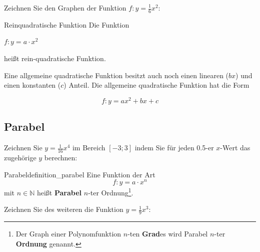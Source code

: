 Zeichnen Sie den Graphen der Funktion $f: y= \frac16 x^2$:


\begin{definition}{Reinquadratische Funktion}{}
Die Funktion

$f: y = a\cdot{}x^2$

heißt rein-quadratische Funktion.
\end{definition}


\begin{bemerkung}{}{}
Eine allgemeine quadratische Funktion besitzt auch noch einen linearen ($bx$) und einen konstanten ($c$) Anteil. Die allgemeine quadratische Funktion hat die Form

$$f: y= ax^2 + bx + c$$
\end{bemerkung}




\newpage

\subsection{Parabel}



Zeichnen Sie $y = \frac{1}{16}x^4$ im Bereich $[-3; 3]$ indem Sie für jeden 0.5-er $x$-Wert das zugehörige $y$ berechnen:



\begin{definition}{Parabel}{definition_parabel}
  Eine Funktion der Art
$$f: y=a\cdot{}x^n$$
mit $n \in \mathbb{N}$ heißt \textbf{Parabel} $n$-ter
Ordnung\footnote{Der Graph einer
Polynomfunktion $n$-ten \textbf{Grad}es wird Parabel $n$-ter \textbf{Ordnung} genannt.}.
\end{definition}
\newpage

Zeichnen Sie des weiteren die Funktion $y = \frac{1}{9}x^3$:

